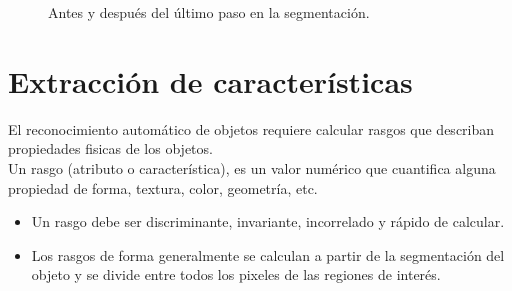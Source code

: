 \documentclass[a4paper, 11pt]{article}
\begin{document}
\begin{figure}[ht]%
    \centering
    \qquad
    \caption{Antes y después del último paso en la segmentación.}%
    \label{paso2}%
\end{figure}


\section{Extracción de características}

El reconocimiento automático de objetos requiere calcular rasgos que describan propiedades fisicas de los objetos.\\

Un rasgo (atributo o característica), es un valor numérico que cuantifica alguna propiedad de forma, textura, color, geometría, etc.

\begin{itemize}
\item Un rasgo debe ser discriminante, invariante, incorrelado y rápido de calcular.
\item Los rasgos de forma generalmente se calculan a partir de la segmentación del objeto y se divide entre todos los pixeles de las regiones de interés.
\end{itemize}
\end{document}
